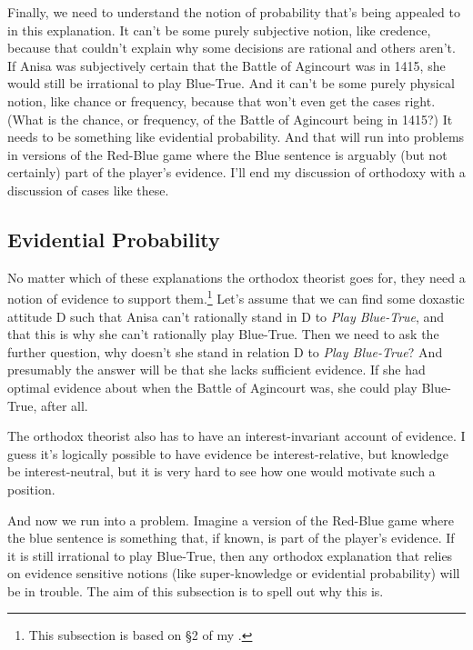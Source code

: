 \documentclass[
  11pt,
]{book}
\begin{document}
Finally, we need to understand the notion of probability that's being appealed to in this explanation. It can't be some purely subjective notion, like credence, because that couldn't explain why some decisions are rational and others aren't. If Anisa was subjectively certain that the Battle of Agincourt was in 1415, she would still be irrational to play Blue-True. And it can't be some purely physical notion, like chance or frequency, because that won't even get the cases right. (What is the chance, or frequency, of the Battle of Agincourt being in 1415?) It needs to be something like evidential probability. And that will run into problems in versions of the Red-Blue game where the Blue sentence is arguably (but not certainly) part of the player's evidence. I'll end my discussion of orthodoxy with a discussion of cases like these.

\hypertarget{orthodoxevidence}{%
\subsection{Evidential Probability}\label{orthodoxevidence}}

No matter which of these explanations the orthodox theorist goes for, they need a notion of evidence to support them.\footnote{This subsection is based on §2 of my \citeyearpar{Weatherson2018-WEAIEA-2}.} Let's assume that we can find some doxastic attitude D such that Anisa can't rationally stand in D to \emph{Play Blue-True}, and that this is why she can't rationally play Blue-True. Then we need to ask the further question, why doesn't she stand in relation D to \emph{Play Blue-True}? And presumably the answer will be that she lacks sufficient evidence. If she had optimal evidence about when the Battle of Agincourt was, she could play Blue-True, after all.

The orthodox theorist also has to have an interest-invariant account of evidence. I guess it's logically possible to have evidence be interest-relative, but knowledge be interest-neutral, but it is very hard to see how one would motivate such a position.

And now we run into a problem. Imagine a version of the Red-Blue game where the blue sentence is something that, if known, is part of the player's evidence. If it is still irrational to play Blue-True, then any orthodox explanation that relies on evidence sensitive notions (like super-knowledge or evidential probability) will be in trouble. The aim of this subsection is to spell out why this is.
\end{document}
